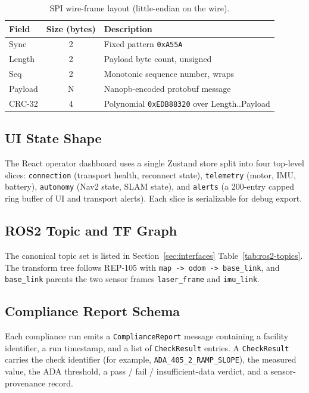\documentclass[11pt,letterpaper]{article}
\begin{document}
\begin{table}[H]
\centering
\caption{SPI wire-frame layout (little-endian on the wire).}
\label{tab:wire-frame}
\small
\begin{tabular}{l c l}
\toprule
\textbf{Field} & \textbf{Size (bytes)} & \textbf{Description} \\
\midrule
Sync    & 2 & Fixed pattern \texttt{0xA55A} \\
Length  & 2 & Payload byte count, unsigned \\
Seq     & 2 & Monotonic sequence number, wraps \\
Payload & N & Nanopb-encoded protobuf message \\
CRC-32  & 4 & Polynomial \texttt{0xEDB88320} over Length..Payload \\
\bottomrule
\end{tabular}
\end{table}

\subsection{UI State Shape}
The React operator dashboard uses a single Zustand store split into
four top-level slices: \texttt{connection} (transport health,
reconnect state), \texttt{telemetry} (motor, IMU, battery),
\texttt{autonomy} (Nav2 state, SLAM state), and \texttt{alerts} (a
200-entry capped ring buffer of UI and transport alerts). Each slice
is serializable for debug export.

\subsection{ROS2 Topic and TF Graph}
The canonical topic set is listed in Section~\ref{sec:interfaces}
Table~\ref{tab:ros2-topics}. The transform tree follows REP-105 with
\texttt{map -> odom -> base\_link}, and \texttt{base\_link} parents
the two sensor frames \texttt{laser\_frame} and \texttt{imu\_link}.

\subsection{Compliance Report Schema}
Each compliance run emits a \texttt{ComplianceReport} message
containing a facility identifier, a run timestamp, and a list of
\texttt{CheckResult} entries. A \texttt{CheckResult} carries the
check identifier (for example, \texttt{ADA\_405\_2\_RAMP\_SLOPE}), the
measured value, the ADA threshold, a pass / fail / insufficient-data
verdict, and a sensor-provenance record.
\end{document}
